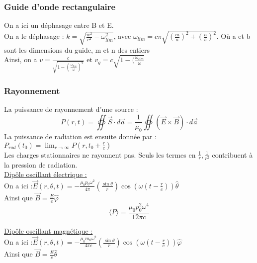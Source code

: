 \documentclass[../main.tex]{subfiles}
\begin{document}
\subsubsection{Guide d'onde rectangulaire}
On a ici un déphasage entre B et E.\\
On a le déphasage : $k = \sqrt{\frac{w^2}{c^2}-\omega_{lim}^2}$, avec $\omega_{lim} = c\pi \sqrt{(\frac{m}{a})^2 + (\frac{n}{b})^2}$. Où a et b sont les dimensions du guide, m et n des entiers\\

Ainsi, on a $v = \frac{c}{\sqrt{1-(\frac{\omega_{lim}}{\omega})^2}}$ et $v_g = c\sqrt{1-(\frac{\omega_{lim}}{\omega}}$\\

\subsubsection{Rayonnement}
La puissance de rayonnement d'une source :\\
\begin{equation}
    P(r,t) = \oiint \vec{S} \cdot d\vec{a} = \frac{1}{\mu_0} \oiint (\vec{E} \times \vec{B})\cdot d\vec{a}
\end{equation}
La puissance de radiation est ensuite donnée par : $P_{rad}(t_0) = \lim_{r\rightarrow \infty} P(r,t_0+\frac{r}{c})$\\

\warning Les charges stationnaires ne rayonnent pas. Seuls les termes en $\frac{1}{r}, \frac{1}{r^2}$ contribuent à la pression de radiation.\\

\quad \underline{Dipôle oscillant électrique :}\\
On a ici :$\vec{E} (r,\theta, t) = -\frac{\mu_0 p_0 \omega^2}{4\pi} (\frac{\sin{\theta}}{r}) \cos(\omega(t-\frac{r}{c})) \hat{\theta}$\\
Ainsi que $\vec{B} = \frac{E}{c} \hat{\varphi}$\\

\begin{equation}
    \langle P\rangle = \frac{\mu_0 p_0^2 \omega^4}{12\pi c}
\end{equation}


\quad \underline{Dipôle oscillant magnétique :}\\
On a ici :$\vec{E} (r,\theta, t) = -\frac{\mu_0 m_0 \omega^2}{4\pi c} (\frac{\sin{\theta}}{r}) \cos(\omega(t-\frac{r}{c})) \hat{\varphi}$\\
Ainsi que $\vec{B} = \frac{E}{c} \hat{\theta}$\\
\end{document}
